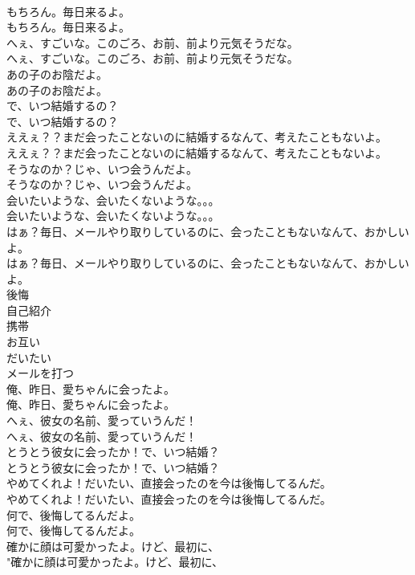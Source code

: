 \documentclass[8pt]{extreport}
\begin{document}
\begin{CJK}{UTF8}{min}
\\	もちろん。毎日来るよ。	
\\	もちろん。毎日来るよ。 
\\	へぇ、すごいな。このごろ、お前、前より元気そうだな。	
\\	へぇ、すごいな。このごろ、お前、前より元気そうだな。 
\\	あの子のお陰だよ。	
\\	あの子のお陰だよ。 
\\	で、いつ結婚するの？	
\\	で、いつ結婚するの？ 
\\	ええぇ？？まだ会ったことないのに結婚するなんて、考えたこともないよ。	
\\	ええぇ？？まだ会ったことないのに結婚するなんて、考えたこともないよ。 
\\	そうなのか？じゃ、いつ会うんだよ。	
\\	そうなのか？じゃ、いつ会うんだよ。 
\\	会いたいような、会いたくないような。。。	
\\	会いたいような、会いたくないような。。。 
\\	はぁ？毎日、メールやり取りしているのに、会ったこともないなんて、おかしいよ。	
\\	はぁ？毎日、メールやり取りしているのに、会ったこともないなんて、おかしいよ。 
\\	後悔
\\	自己紹介
\\	携帯
\\	お互い
\\	だいたい
\\	メールを打つ
\\	俺、昨日、愛ちゃんに会ったよ。	
\\	俺、昨日、愛ちゃんに会ったよ。 
\\	へぇ、彼女の名前、愛っていうんだ！	
\\	へぇ、彼女の名前、愛っていうんだ！ 
\\	とうとう彼女に会ったか！で、いつ結婚？	
\\	とうとう彼女に会ったか！で、いつ結婚？ 
\\	やめてくれよ！だいたい、直接会ったのを今は後悔してるんだ。	
\\	やめてくれよ！だいたい、直接会ったのを今は後悔してるんだ。 
\\	何で、後悔してるんだよ。	
\\	何で、後悔してるんだよ。 
\\	確かに顔は可愛かったよ。けど、最初に、	
\\	"確かに顔は可愛かったよ。けど、最初に、 

\end{CJK}
\end{document}

